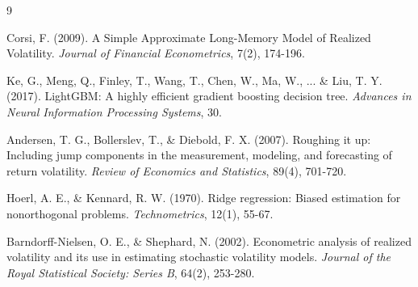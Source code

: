 \documentclass[12pt,a4paper]{article}
\begin{document}
\begin{thebibliography}{9}

Corsi, F. (2009). A Simple Approximate Long-Memory Model of Realized Volatility. \textit{Journal of Financial Econometrics}, 7(2), 174-196.

Ke, G., Meng, Q., Finley, T., Wang, T., Chen, W., Ma, W., ... \& Liu, T. Y. (2017). LightGBM: A highly efficient gradient boosting decision tree. \textit{Advances in Neural Information Processing Systems}, 30.

Andersen, T. G., Bollerslev, T., \& Diebold, F. X. (2007). Roughing it up: Including jump components in the measurement, modeling, and forecasting of return volatility. \textit{Review of Economics and Statistics}, 89(4), 701-720.

Hoerl, A. E., \& Kennard, R. W. (1970). Ridge regression: Biased estimation for nonorthogonal problems. \textit{Technometrics}, 12(1), 55-67.

Barndorff-Nielsen, O. E., \& Shephard, N. (2002). Econometric analysis of realized volatility and its use in estimating stochastic volatility models. \textit{Journal of the Royal Statistical Society: Series B}, 64(2), 253-280.

\end{thebibliography}
\end{document}

